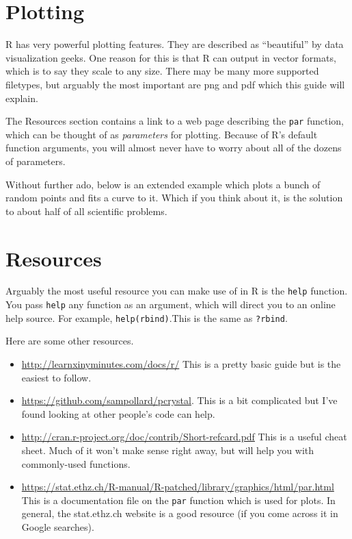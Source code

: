 \documentclass[12pt]{article}
\begin{document}
\section{Plotting}

R has very powerful plotting features. They are described as ``beautiful'' by data visualization geeks. One reason for this is that R can output in vector formats, which is to say they scale to any size. There may be many more supported filetypes, but arguably the most important are png and pdf which this guide will explain.

The Resources section contains a link to a web page describing the \verb|par| function, which can be thought of as \emph{parameters} for plotting. Because of R's default function arguments, you will almost never have to worry about all of the dozens of parameters.

Without further ado, below is an extended example which plots a bunch of random points and fits a curve to it. Which if you think about it, is the solution to about half of all scientific problems.



\section{Resources}
Arguably the most useful resource you can make use of in R is the \verb|help| function. You pass \verb|help| any function as an argument, which will direct you to an online help source. For example, \verb|help(rbind)|.This is the same as \verb|?rbind|.

Here are some other resources.
\begin{itemize}
	\item \url{http://learnxinyminutes.com/docs/r/} This is a pretty basic guide but is the easiest to follow.
	\item \url{https://github.com/sampollard/pcrystal}. This is a bit complicated but I've found looking at other people's code can help.
	\item \url{http://cran.r-project.org/doc/contrib/Short-refcard.pdf} This is a useful cheat sheet. Much of it won't make sense right away, but will help you with commonly-used functions.
	\item \url{https://stat.ethz.ch/R-manual/R-patched/library/graphics/html/par.html} This is a documentation file on the \verb|par| function which is used for plots. In general, the stat.ethz.ch website is a good resource (if you come across it in Google searches).
\end{itemize}
\end{document}
